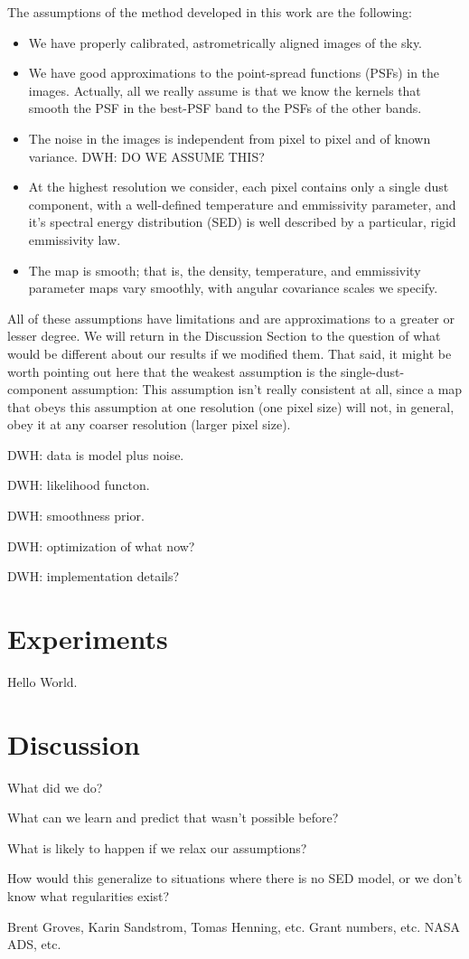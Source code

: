 \documentclass[12pt, preprint]{aastex}
\newcommand{\acronym}[1]{{\small{#1}}}
\begin{document}
The assumptions of the method developed in this work are the
following:
\begin{itemize}
\item We have properly calibrated, astrometrically aligned images of
  the sky.
\item We have good approximations to the point-spread functions (PSFs)
  in the images.  Actually, all we really assume is that we know the
  kernels that smooth the PSF in the best-PSF band to the PSFs of the
  other bands.
\item The noise in the images is independent from pixel to pixel and
  of known variance. DWH: DO WE ASSUME THIS?
\item At the highest resolution we consider, each pixel contains only
  a single dust component, with a well-defined temperature and
  emmissivity parameter, and it's spectral energy distribution (SED)
  is well described by a particular, rigid emmissivity law.
\item The map is smooth; that is, the density, temperature, and
  emmissivity parameter maps vary smoothly, with angular covariance
  scales we specify.
\end{itemize}
All of these assumptions have limitations and are approximations to a
greater or lesser degree.
We will return in the Discussion Section to the question of what would
be different about our results if we modified them.
That said, it might be worth pointing out here that the weakest
assumption is the single-dust-component assumption:
This assumption isn't really consistent at all, since a map that obeys
this assumption at one resolution (one pixel size) will not, in
general, obey it at any coarser resolution (larger pixel size).

DWH: data is model plus noise.

DWH: likelihood functon.

DWH: smoothness prior.

DWH: optimization of what now?

DWH: implementation details?

\section{Experiments}

Hello World.

\section{Discussion}

What did we do?

What can we learn and predict that wasn't possible before?

What is likely to happen if we relax our assumptions?

How would this generalize to situations where there is no SED model,
or we don't know what regularities exist?

\acknowledgements
Brent Groves, Karin Sandstrom, Tomas Henning, etc.
Grant numbers, etc.
\acronym{NASA ADS}, etc.
\end{document}
